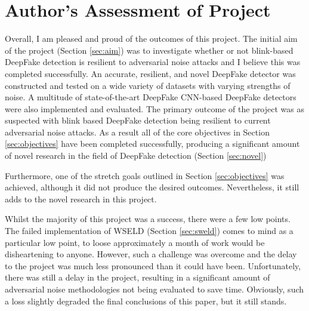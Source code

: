 \section{Author's Assessment of Project}


Overall, I am pleased and proud of the outcomes of this project. The initial aim of the project (Section \ref{sec:aim}) was to investigate whether or not blink-based DeepFake detection is resilient to adversarial noise attacks and I believe this was completed successfully. An accurate, resilient, and novel DeepFake detector was constructed and tested on a wide variety of datasets with varying strengths of noise. A multitude of state-of-the-art DeepFake CNN-based DeepFake detectors were also implemented and evaluated. The primary outcome of the project was as suspected with blink based DeepFake detection being resilient to current adversarial noise attacks. As a result all of the core objectives in Section \ref{sec:objectives} have been completed successfully, producing a significant amount of novel research in the field of DeepFake detection (Section \ref{sec:novel})

Furthermore, one of the stretch goals outlined in Section \ref{sec:objectives} was achieved, although it did not produce the desired outcomes. Nevertheless, it still adds to the novel research in this project. 

Whilst the majority of this project was a success, there were a few low points. The failed implementation of WSELD (Section \ref{sec:sweld}) comes to mind as a particular low point, to loose approximately a month of work would be disheartening to anyone. However, such a challenge was overcome and the delay to the project was much less pronounced than it could have been. Unfortunately, there was still a delay in the project, resulting in a significant amount of adversarial noise methodologies not being evaluated to save time. Obviously, such a loss slightly degraded the final conclusions of this paper, but it still stands.

